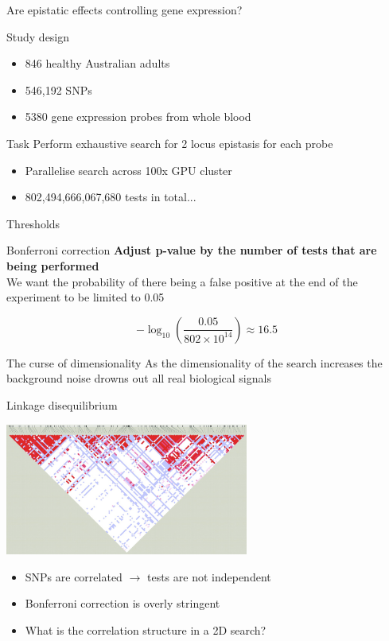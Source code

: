 \documentclass{beamer}
\begin{document}
\begin{frame}{Are epistatic effects controlling gene expression?}
	\begin{block}{Study design}
		\begin{itemize}
			\item 846 healthy Australian adults
			\item 546,192 SNPs
			\item 5380 gene expression probes from whole blood
		\end{itemize}
	\end{block}
	\begin{block}{Task}
		Perform exhaustive search for 2 locus epistasis for each probe
	\end{block}
	\begin{itemize}
		\item Parallelise search across 100x GPU cluster
		\item 802,494,666,067,680 tests in total...
	\end{itemize}
\end{frame}

\begin{frame}{Thresholds}

	\begin{block}{Bonferroni correction}
		\textbf{Adjust p-value by the number of tests that are being performed}\\
		We want the probability of there being a false positive at the end of the experiment to be limited to 0.05
	\end{block}
	\begin{equation}
		-\log_{10}\left ( \frac{0.05}{802\times10^{14}} \right) \approx 16.5 \nonumber
	\end{equation}
	\begin{block}{The curse of dimensionality}
		As the dimensionality of the search increases the background noise drowns out all real biological signals
	\end{block}
\end{frame}


\begin{frame}{Linkage disequilibrium}
	\begin{center}
		\includegraphics[width=8cm]{ld.png}
	\end{center}
	\begin{itemize}
		\item SNPs are correlated $\rightarrow$ tests are not independent
		\item Bonferroni correction is overly stringent
		\item What is the correlation structure in a 2D search?
	\end{itemize}
\end{frame}
\end{document}
